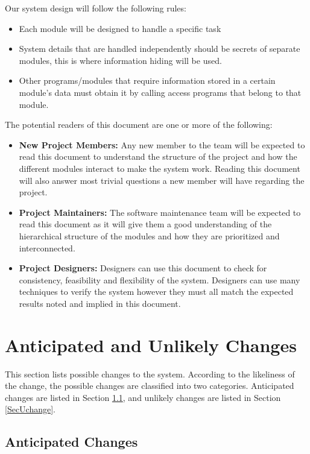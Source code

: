\documentclass[12pt, titlepage]{article}
\begin{document}
Our system design will follow the following rules:
\begin{itemize}
\item Each module will be designed to handle a specific task
\item System details that are handled independently should be secrets of separate modules, this is where information hiding will be used.
\item Other programs/modules that require information stored in a certain module’s data must obtain it by calling access programs that belong to that module.
\end{itemize}

The potential readers of this document are one or more of the following:
\begin{itemize}
\item \textbf{New Project Members:} Any new member to the team will be expected to read this document to understand the structure of the project and how the different modules interact to make  the system work. Reading this document will also answer most trivial questions a new member will have regarding the project.
\item \textbf{Project Maintainers:} The software maintenance team will be expected to read this document as it will give them a good understanding of the hierarchical structure of the modules and how they are prioritized and interconnected. 
\item \textbf{Project Designers:} Designers can use this document to check for consistency, feasibility and flexibility of the system. Designers can use many techniques to verify the system however they must all match the expected results noted and implied in this document.
\end{itemize}

\section{Anticipated and Unlikely Changes} \label{SecChange}

This section lists possible changes to the system. According to the likeliness
of the change, the possible changes are classified into two
categories. Anticipated changes are listed in Section \ref{SecAchange}, and
unlikely changes are listed in Section \ref{SecUchange}.

\subsection{Anticipated Changes} \label{SecAchange}
\end{document}
